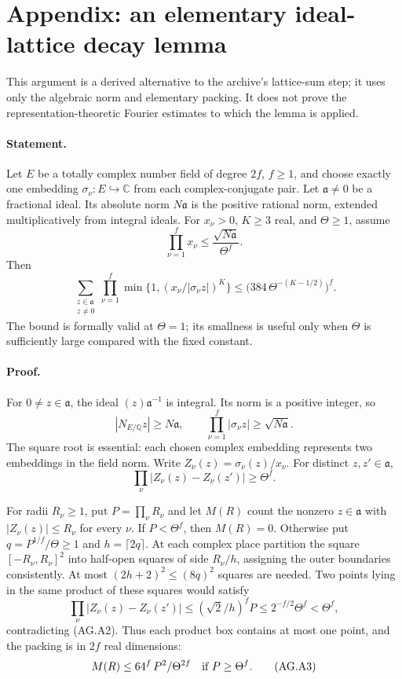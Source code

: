 \documentclass[11pt,a4paper]{article}
\numberwithin{equation}{section}
\theoremstyle{remark}\newtheorem{remark}[theorem]{Remark}
\begin{document}
\section{Appendix: an elementary ideal-lattice decay lemma}
\label{app:ag-lattice}

This argument is a derived alternative to the archive's
lattice-sum step; it uses only the algebraic norm and elementary
packing.  It does not prove the representation-theoretic Fourier
estimates to which the lemma is applied.

\paragraph{Statement.}
Let \(E\) be a totally complex number field of degree \(2f\),
\(f\ge1\), and choose exactly one embedding
\(\sigma_\nu:E\hookrightarrow\mathbb C\) from each complex-conjugate
pair.  Let \(\mathfrak a\ne0\) be a fractional ideal.  Its absolute
norm \(N\mathfrak a\) is the positive rational norm, extended
multiplicatively from integral ideals.  For \(x_\nu>0\), \(K\ge3\)
real, and \(\Theta\ge1\), assume
\[
 \prod_{\nu=1}^{f}x_\nu\le
        \frac{\sqrt{N\mathfrak a}}{\Theta^f}.
\]
Then
\[
 \sum_{\substack{z\in\mathfrak a\\z\ne0}}
 \prod_{\nu=1}^{f}
       \min\{1,(x_\nu/|\sigma_\nu z|)^K\}
 \le \bigl(384\,\Theta^{-(K-1/2)}\bigr)^f.                 \tag{AG.A1}
\]
The bound is formally valid at \(\Theta=1\); its smallness is
useful only when \(\Theta\) is sufficiently large compared with
the fixed constant.

\paragraph{Proof.}
For \(0\ne z\in\mathfrak a\), the ideal
\((z)\mathfrak a^{-1}\) is integral.  Its norm is a positive
integer, so
\[
 |N_{E/\mathbb Q}z|\ge N\mathfrak a,\qquad
 \prod_{\nu=1}^{f}|\sigma_\nu z|\ge\sqrt{N\mathfrak a}.
\]
The square root is essential: each chosen complex embedding
represents two embeddings in the field norm.
Write \(Z_\nu(z)=\sigma_\nu(z)/x_\nu\).
For distinct \(z,z'\in\mathfrak a\),
\[
 \prod_\nu|Z_\nu(z)-Z_\nu(z')|\ge\Theta^f.                 \tag{AG.A2}
\]

For radii \(R_\nu\ge1\), put \(P=\prod_\nu R_\nu\) and let
\(M(R)\) count the nonzero \(z\in\mathfrak a\) with
\(|Z_\nu(z)|\le R_\nu\) for every \(\nu\).
If \(P<\Theta^f\), then \(M(R)=0\).
Otherwise put \(q=P^{1/f}/\Theta\ge1\) and
\(h=\lceil2q\rceil\).
At each complex place partition the square
\([-R_\nu,R_\nu]^2\) into half-open squares of side \(R_\nu/h\),
assigning the outer boundaries consistently.
At most \((2h+2)^2\le(8q)^2\) squares are needed.
Two points lying in the same product of these squares would
satisfy
\[
 \prod_\nu|Z_\nu(z)-Z_\nu(z')|
 \le(\sqrt2/h)^fP
 \le 2^{-f/2}\Theta^f<\Theta^f,
\]
contradicting (AG.A2).  Thus each product box contains at most
one point, and the packing is in \(2f\) real dimensions:
\[
 M(R)\le64^f\,P^2/\Theta^{2f}
       \quad\hbox{if }P\ge\Theta^f.                        \tag{AG.A3}
\]
\end{document}
